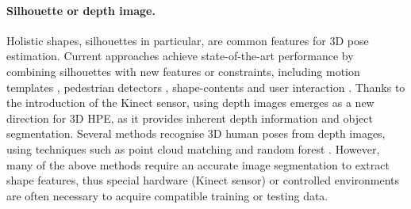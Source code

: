 \paragraph{Silhouette or depth image.} 
Holistic shapes, silhouettes in particular, are common features for 3D pose estimation. 
Current approaches achieve state-of-the-art performance by combining silhouettes with new features or constraints, including motion templates \cite{Rogez2012}, pedestrian detectors \cite{Andriluka2010}, shape-contents \cite{Agarwal2006} and user interaction \cite{Guan2009}.  
Thanks to the introduction of the Kinect sensor, using depth images emerges as a new direction for 3D HPE, as it provides inherent depth information and object segmentation. 
Several methods recognise 3D human poses from depth images, using techniques such as point cloud matching \cite{Baak2011, Ye2011} and random forest \cite{Taylor2012, Sun2012}. 
However, many of the above methods require an accurate image segmentation to extract shape features, thus special hardware (\eg Kinect sensor) or controlled environments are often necessary to acquire compatible training or testing data.  

